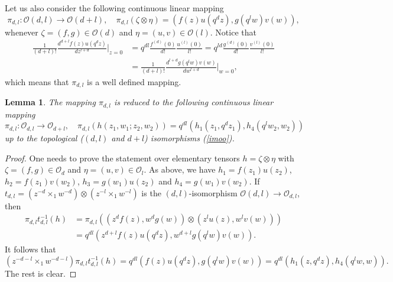 \documentclass[12pt,reqno]{amsart}%
\theoremstyle{plain}
\newtheorem{lemma}{Lemma}
\numberwithin{theorem}{section} \numberwithin{equation}{section}
\numberwithin{lemma}{section}
\numberwithin{remark}{section}
\numberwithin{example}{section}
\numberwithin{proposition}{section}
\numberwithin{definition}{section}
\numberwithin{corollary}{section}
\begin{document}
Let us also consider the following continuous linear mapping
\[
\pi_{d,l}:\mathcal{O}\left(  d,l\right)  \longrightarrow\mathcal{O}\left(
d+l\right)  ,\quad\pi_{d,l}\left(  \zeta\otimes\eta\right)  =\left(  f\left(
z\right)  u\left(  q^{d}z\right)  ,g\left(  q^{l}w\right)  v\left(  w\right)
\right)  ,
\]
whenever $\zeta=\left(  f,g\right)  \in\mathcal{O}\left(  d\right)  $ and
$\eta=\left(  u,v\right)  \in\mathcal{O}\left(  l\right)  $. Notice that
\begin{align*}
\frac{1}{\left(  d+l\right)  !}\frac{d^{d+l}f\left(  z\right)  u\left(
q^{d}z\right)  }{dz^{l+d}}|_{z=0}  &  =q^{dl}\frac{f^{\left(  d\right)
}\left(  0\right)  }{d!}\frac{u^{\left(  l\right)  }\left(  0\right)  }%
{l!}=q^{ld}\frac{g^{\left(  d\right)  }\left(  0\right)  }{d!}\frac{v^{\left(
l\right)  }\left(  0\right)  }{l!}\\
&  =\frac{1}{\left(  d+l\right)  !}\frac{d^{l+d}g\left(  q^{l}w\right)
v\left(  w\right)  }{dw^{l+d}}|_{w=0},
\end{align*}
which means that $\pi_{d,l}$ is a well defined mapping.

\begin{lemma}
\label{lemPidl}The mapping $\pi_{d,l}$ is reduced to the following continuous
linear mapping
\[
\pi_{d,l}:\mathcal{O}_{d,l}\longrightarrow\mathcal{O}_{d+l},\quad\pi
_{d,l}\left(  h\left(  z_{1},w_{1};z_{2},w_{2}\right)  \right)  =q^{dl}\left(
h_{1}\left(  z_{1},q^{d}z_{1}\right)  ,h_{4}\left(  q^{l}w_{2},w_{2}\right)
\right)
\]
up to the topological ($\left(  d,l\right)  $ and $d+l$) isomorphisms
(\ref{imoo}).
\end{lemma}

\begin{proof}
One needs to prove the statement over elementary tensors $h=\zeta\otimes\eta$
with $\zeta=\left(  f,g\right)  \in\mathcal{O}_{d}$ and $\eta=\left(
u,v\right)  \in\mathcal{O}_{l}$. As above, we have $h_{1}=f\left(
z_{1}\right)  u\left(  z_{2}\right)  $, $h_{2}=f\left(  z_{1}\right)  v\left(
w_{2}\right)  $, $h_{3}=g\left(  w_{1}\right)  u\left(  z_{2}\right)  $ and
$h_{4}=g\left(  w_{1}\right)  v\left(  w_{2}\right)  $. If $t_{d,l}=\left(
z^{-d}\times_{1}w^{-d}\right)  \otimes\left(  z^{-l}\times_{1}w^{-l}\right)  $
is the $\left(  d,l\right)  $-isomorphism $\mathcal{O}\left(  d,l\right)
\rightarrow\mathcal{O}_{d,l}$, then
\begin{align*}
\pi_{d,l}t_{d,l}^{-1}\left(  h\right)   &  =\pi_{d,l}\left(  \left(
z^{d}f\left(  z\right)  ,w^{d}g\left(  w\right)  \right)  \otimes\left(
z^{l}u\left(  z\right)  ,w^{l}v\left(  w\right)  \right)  \right) \\
&  =q^{dl}\left(  z^{d+l}f\left(  z\right)  u\left(  q^{d}z\right)
,w^{d+l}g\left(  q^{l}w\right)  v\left(  w\right)  \right)  .
\end{align*}
It follows that
\[
\left(  z^{-d-l}\times_{1}w^{-d-l}\right)  \pi_{d,l}t_{d,l}^{-1}\left(
h\right)  =q^{dl}\left(  f\left(  z\right)  u\left(  q^{d}z\right)  ,g\left(
q^{l}w\right)  v\left(  w\right)  \right)  =q^{dl}\left(  h_{1}\left(
z,q^{d}z\right)  ,h_{4}\left(  q^{l}w,w\right)  \right)  .
\]
The rest is clear.
\end{proof}
\end{document}
